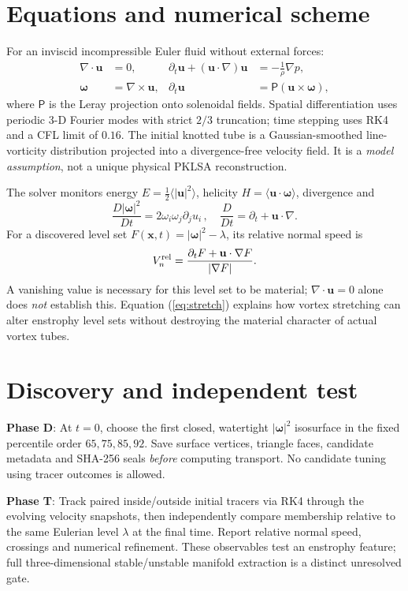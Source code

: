 \documentclass[10pt,a4paper]{article}
\begin{document}
\section{Equations and numerical scheme}
For an inviscid incompressible Euler fluid without external forces:
\begin{align}
\nabla\cdot \mathbf u &= 0, &
\partial_t \mathbf u + (\mathbf u\cdot\nabla)\mathbf u &= -\frac1\rho\nabla p, \\
\boldsymbol\omega &= \nabla\times\mathbf u, &
\partial_t\mathbf u &= \mathsf P(\mathbf u\times\boldsymbol\omega),
\end{align}
where $\mathsf P$ is the Leray projection onto solenoidal fields. Spatial differentiation uses periodic 3-D Fourier modes with strict $2/3$ truncation; time stepping uses RK4 and a CFL limit of $0.16$. The initial knotted tube is a Gaussian-smoothed line-vorticity distribution projected into a divergence-free velocity field. It is a \emph{model assumption}, not a unique physical PKLSA reconstruction.
\par The solver monitors energy $E=\frac12\langle|\mathbf u|^2\rangle$, helicity $H=\langle\mathbf u\cdot\boldsymbol\omega\rangle$, divergence and
\begin{equation}
\frac{D|\boldsymbol\omega|^2}{Dt}=2\omega_i\omega_j\partial_j u_i\,,\quad \frac D{Dt}=\partial_t+\mathbf u\cdot\nabla.
\label{eq:stretch}
\end{equation}
For a discovered level set $F(\mathbf x,t)=|\boldsymbol\omega|^2-\lambda$, its relative normal speed is
\begin{equation}
V_n^{\rm rel}=\frac{\partial_t F+\mathbf u\cdot\nabla F}{|\nabla F|}.
\end{equation}
A vanishing value is necessary for this level set to be material; $\nabla\cdot\mathbf u=0$ alone does \emph{not} establish this. Equation (\ref{eq:stretch}) explains how vortex stretching can alter enstrophy level sets without destroying the material character of actual vortex tubes.
\section{Discovery and independent test}
\textbf{Phase D}: At $t=0$, choose the first closed, watertight $|\boldsymbol\omega|^2$ isosurface in the fixed percentile order $65,75,85,92$. Save surface vertices, triangle faces, candidate metadata and SHA-256 seals \emph{before} computing transport. No candidate tuning using tracer outcomes is allowed.
\par \textbf{Phase T}: Track paired inside/outside initial tracers via RK4 through the evolving velocity snapshots, then independently compare membership relative to the same Eulerian level $\lambda$ at the final time. Report relative normal speed, crossings and numerical refinement. These observables test an enstrophy feature; full three-dimensional stable/unstable manifold extraction is a distinct unresolved gate.
\end{document}
